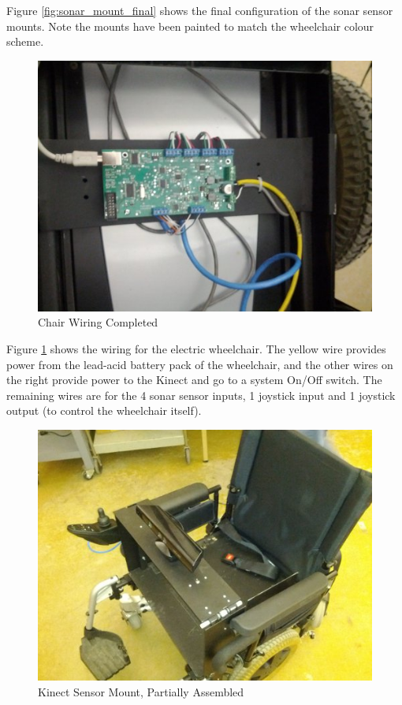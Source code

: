 \documentclass[oneside,final,a4paper]{report}
\begin{document}
Figure \ref{fig:sonar_mount_final} shows the final configuration of the sonar sensor mounts. Note the mounts have been painted to match the wheelchair colour scheme.

\begin{figure}[hbt]
 \centering
 \includegraphics[scale=0.35]{chair_wired}
 \caption{Chair Wiring Completed}
 \label{fig:chair_wired}
\end{figure}

Figure \ref{fig:chair_wired} shows the wiring for the electric wheelchair. The yellow wire provides power from the lead-acid battery pack of the wheelchair, and the other wires on the right provide power to the Kinect and go to a system On/Off switch. The remaining wires are for the 4 sonar sensor inputs, 1 joystick input and 1 joystick output (to control the wheelchair itself).

\begin{figure}[hbt]
 \centering
 \includegraphics[scale=0.35]{mech_complete}
 \caption{Kinect Sensor Mount, Partially Assembled}
 \label{fig:mech_complete}
\end{figure}
\end{document}
